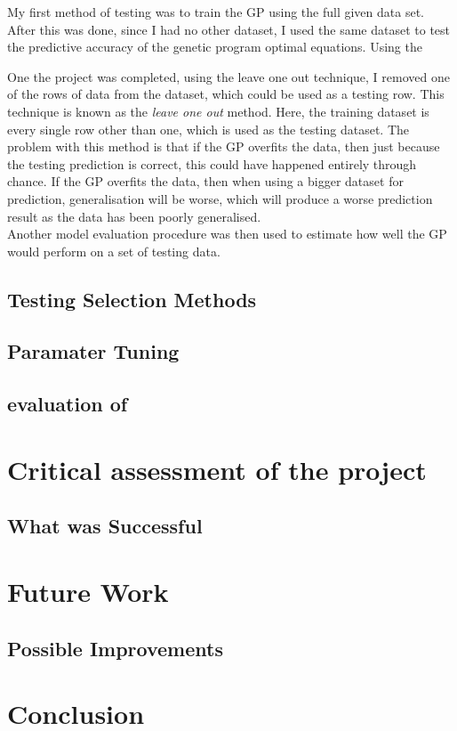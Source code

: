 \documentclass[11pt]{article}
\begin{document}
My first method of testing was to train the GP using the full given data set. After this was done, since I had no other dataset, I used the same dataset to test the predictive accuracy of the genetic program optimal equations. Using the 

One the project was completed, using the leave one out technique, I removed one of the rows of data from the dataset, which could be used as a testing row. This technique is known as the  \textit{leave one out} method. Here, the training dataset is every single row other than one, which is used as the testing dataset. The problem with this method is that if the GP overfits the data, then just because the testing prediction is correct, this could have happened entirely through chance. If the GP overfits the data, then when using a bigger dataset for prediction, generalisation will be worse, which will produce a worse prediction result as the data has been poorly generalised. \\

Another model evaluation procedure was then used to estimate how well the GP would perform on a set of testing data. 
\subsection{Testing Selection Methods}
\subsection{Paramater Tuning}

\subsection{evaluation of }
\newpage
\section{Critical assessment of the project }
\subsection{What was Successful}

\newpage
\section{Future Work}
\subsection{Possible Improvements}

\newpage
\section{Conclusion}
\end{document}
